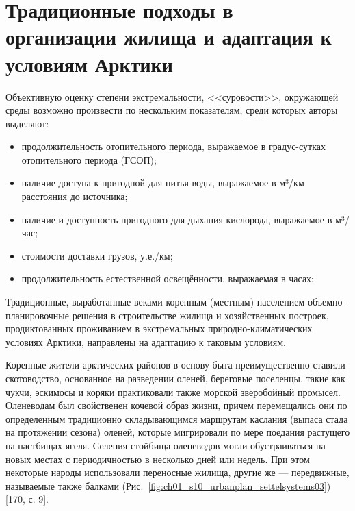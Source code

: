 \section{Традиционные подходы в организации жилища и адаптация к условиям Арктики}\label{CH01_experience_indigenous}
Объективную оценку степени экстремальности, <<суровости>>, окружающей среды возможно произвести по нескольким показателям, среди которых авторы выделяют:

\begin{itemize}
    \item продолжительность отопительного периода, выражаемое в градус-сутках отопительного периода (ГСОП);
    \item наличие доступа к пригодной для питья воды, выражаемое в м³/км расстояния до источника;
    \item наличие и доступность пригодного для дыхания кислорода, выражаемое в м³/час;
    \item стоимости доставки грузов, у.е./км;
    \item продолжительность естественной освещённости, выражаемая в часах;
\end{itemize}


Традиционные, выработанные веками коренным (местным) населением объемно-планировочные решения в строительстве жилища и хозяйственных построек,
продиктованных проживанием в экстремальных природно-климатических условиях Арктики, направлены на адаптацию к таковым условиям.

Коренные жители арктических районов в основу быта преимущественно ставили скотоводство, основанное на разведении оленей, береговые поселенцы, такие как чукчи,
эскимосы и коряки практиковали также морской зверобойный промысел. Оленеводам был свойственен кочевой образ жизни, причем перемещались они по определенным традиционно
складывающимся маршрутам каслания (выпаса стада на протяжении сезона) оленей, которые мигрировали по мере поедания растущего на пастбищах ягеля. Селения-стойбища оленеводов
могли обустраиваться на новых местах с периодичностью в несколько дней или недель. При этом некоторые народы использовали переносные жилища, другие же --– передвижные, называемые также балками (Рис.~\ref{fig:ch01_s10_urbanplan_settelsystems03}) [170, с. 9].

